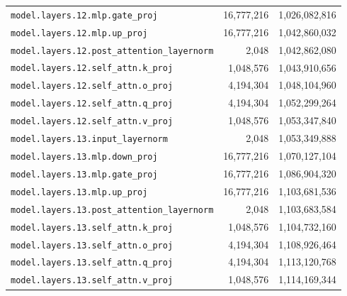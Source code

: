 \documentclass[10pt,a4paper]{article}
\begin{document}
\begin{appendices}
\begin{longtable}{p{9.5cm}rr}
\texttt{model.\allowbreak{}layers.\allowbreak{}12.\allowbreak{}mlp.\allowbreak{}gate\_proj} & 16,777,216 & 1,026,082,816 \\
\texttt{model.\allowbreak{}layers.\allowbreak{}12.\allowbreak{}mlp.\allowbreak{}up\_proj} & 16,777,216 & 1,042,860,032 \\
\texttt{model.\allowbreak{}layers.\allowbreak{}12.\allowbreak{}post\_attention\_layernorm} & 2,048 & 1,042,862,080 \\
\texttt{model.\allowbreak{}layers.\allowbreak{}12.\allowbreak{}self\_attn.\allowbreak{}k\_proj} & 1,048,576 & 1,043,910,656 \\
\texttt{model.\allowbreak{}layers.\allowbreak{}12.\allowbreak{}self\_attn.\allowbreak{}o\_proj} & 4,194,304 & 1,048,104,960 \\
\texttt{model.\allowbreak{}layers.\allowbreak{}12.\allowbreak{}self\_attn.\allowbreak{}q\_proj} & 4,194,304 & 1,052,299,264 \\
\texttt{model.\allowbreak{}layers.\allowbreak{}12.\allowbreak{}self\_attn.\allowbreak{}v\_proj} & 1,048,576 & 1,053,347,840 \\
\texttt{model.\allowbreak{}layers.\allowbreak{}13.\allowbreak{}input\_layernorm} & 2,048 & 1,053,349,888 \\
\texttt{model.\allowbreak{}layers.\allowbreak{}13.\allowbreak{}mlp.\allowbreak{}down\_proj} & 16,777,216 & 1,070,127,104 \\
\texttt{model.\allowbreak{}layers.\allowbreak{}13.\allowbreak{}mlp.\allowbreak{}gate\_proj} & 16,777,216 & 1,086,904,320 \\
\texttt{model.\allowbreak{}layers.\allowbreak{}13.\allowbreak{}mlp.\allowbreak{}up\_proj} & 16,777,216 & 1,103,681,536 \\
\texttt{model.\allowbreak{}layers.\allowbreak{}13.\allowbreak{}post\_attention\_layernorm} & 2,048 & 1,103,683,584 \\
\texttt{model.\allowbreak{}layers.\allowbreak{}13.\allowbreak{}self\_attn.\allowbreak{}k\_proj} & 1,048,576 & 1,104,732,160 \\
\texttt{model.\allowbreak{}layers.\allowbreak{}13.\allowbreak{}self\_attn.\allowbreak{}o\_proj} & 4,194,304 & 1,108,926,464 \\
\texttt{model.\allowbreak{}layers.\allowbreak{}13.\allowbreak{}self\_attn.\allowbreak{}q\_proj} & 4,194,304 & 1,113,120,768 \\
\texttt{model.\allowbreak{}layers.\allowbreak{}13.\allowbreak{}self\_attn.\allowbreak{}v\_proj} & 1,048,576 & 1,114,169,344 \\

\end{longtable}
\end{appendices}
\end{document}
